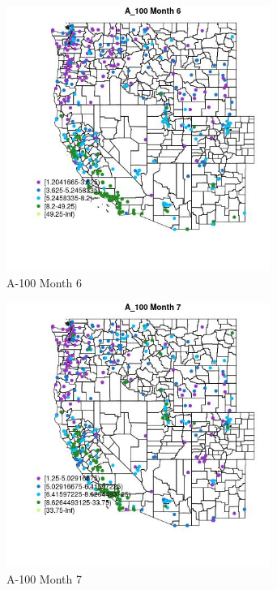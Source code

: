 \begin{figure} 
\centering  
\includegraphics[width=0.77\textwidth]{Code_Outputs/ML_input_report_ML_input_PM25_Step5_part_d_de_duplicated_aves_ML_input_MapObsMo6A_100.jpg} 
\caption{\label{fig:ML_input_report_ML_input_PM25_Step5_part_d_de_duplicated_aves_ML_inputMapObsMo6A_100}A-100 Month 6} 
\end{figure} 
 

\begin{figure} 
\centering  
\includegraphics[width=0.77\textwidth]{Code_Outputs/ML_input_report_ML_input_PM25_Step5_part_d_de_duplicated_aves_ML_input_MapObsMo7A_100.jpg} 
\caption{\label{fig:ML_input_report_ML_input_PM25_Step5_part_d_de_duplicated_aves_ML_inputMapObsMo7A_100}A-100 Month 7} 
\end{figure} 
 

